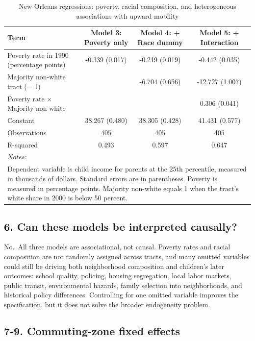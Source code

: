 \documentclass[
]{article}
\begin{document}
\begin{longtable}[t]{lccc}
\caption{\label{tab:models-345-table}New Orleans regressions: poverty, racial composition, and heterogeneous associations with upward mobility}\\
\toprule
Term & Model 3: Poverty only & Model 4: + Race dummy & Model 5: + Interaction\\
\midrule
Poverty rate in 1990 (percentage points) & -0.339 (0.017) & -0.219 (0.019) & -0.442 (0.035)\\
Majority non-white tract (= 1) &  & -6.704 (0.656) & -12.727 (1.007)\\
Poverty rate × Majority non-white &  &  & 0.306 (0.041)\\
Constant & 38.267 (0.480) & 38.305 (0.428) & 41.431 (0.577)\\
Observations & 405 & 405 & 405\\
\addlinespace
R-squared & 0.493 & 0.597 & 0.647\\
\bottomrule
\multicolumn{4}{l}{\rule{0pt}{1em}\textit{Notes: }}\\
\multicolumn{4}{l}{\rule{0pt}{1em}Dependent variable is child income for parents at the 25th percentile, measured in thousands of dollars. Standard errors are in parentheses. Poverty is measured in percentage points. Majority non-white equals 1 when the tract's white share in 2000 is below 50 percent.}\\
\end{longtable}

\subsection{6. Can these models be interpreted
causally?}\label{can-these-models-be-interpreted-causally}

No.~All three models are associational, not causal. Poverty rates and
racial composition are not randomly assigned across tracts, and many
omitted variables could still be driving both neighborhood composition
and children's later outcomes: school quality, policing, housing
segregation, local labor markets, public transit, environmental hazards,
family selection into neighborhoods, and historical policy differences.
Controlling for one omitted variable improves the specification, but it
does not solve the broader endogeneity problem.

\subsection{7-9. Commuting-zone fixed
effects}\label{commuting-zone-fixed-effects}
\end{document}
